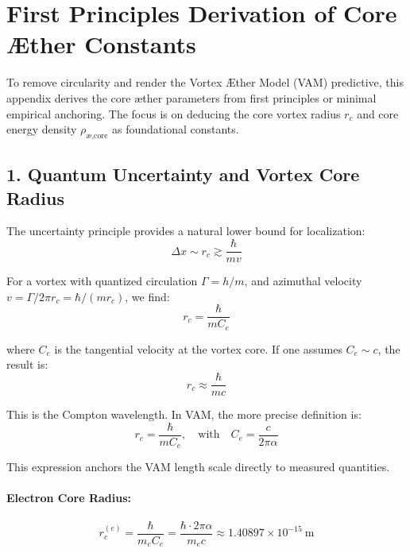 \section{First Principles Derivation of Core \AE{}ther Constants}

To remove circularity and render the Vortex \AE{}ther Model (VAM) predictive, this appendix derives the core \ae{}ther parameters from first principles or minimal empirical anchoring. The focus is on deducing the core vortex radius $r_c$ and core energy density $\rho_{\text{\ae,core}}$ as foundational constants.

\subsection{1. Quantum Uncertainty and Vortex Core Radius}

The uncertainty principle provides a natural lower bound for localization:
\begin{equation}
\Delta x \sim r_c \gtrsim \frac{\hbar}{m v}
\end{equation}

For a vortex with quantized circulation $\Gamma = h/m$, and azimuthal velocity $v = \Gamma / 2\pi r_c = \hbar / (m r_c)$, we find:
\begin{equation}
r_c = \frac{\hbar}{m C_e}
\end{equation}

where $C_e$ is the tangential velocity at the vortex core. If one assumes $C_e \sim c$, the result is:
\begin{equation}
r_c \approx \frac{\hbar}{m c}
\end{equation}

This is the Compton wavelength. In VAM, the more precise definition is:
\begin{equation}
r_c = \frac{\hbar}{m C_e}, \quad \text{with} \quad C_e = \frac{c}{2\pi \alpha}
\end{equation}

This expression anchors the VAM length scale directly to measured quantities.

\paragraph{Electron Core Radius:}
\begin{equation}
r_c^{(e)} = \frac{\hbar}{m_e C_e} = \frac{\hbar \cdot 2\pi \alpha}{m_e c} \approx 1.40897 \times 10^{-15} \ \text{m}
\end{equation}


